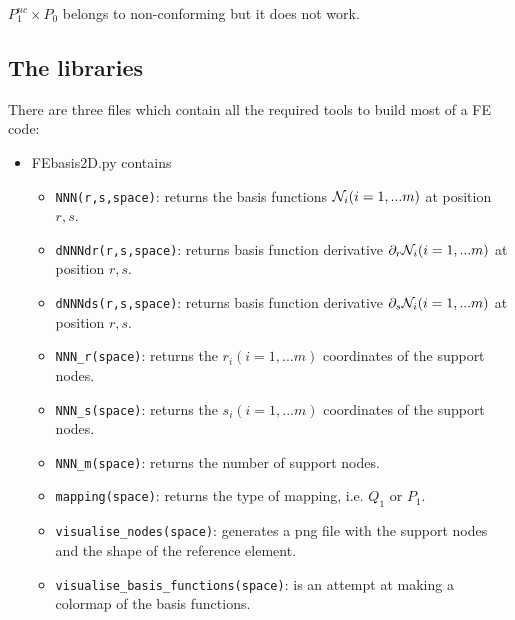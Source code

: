 \newpage



$P_1^{nc} \times P_0$ belongs to non-conforming but it does not work.

\newpage
\subsection*{The libraries}

There are three files which contain all the required tools to build most of a FE code:

\begin{itemize}

\item {\pythonfile FEbasis2D.py} contains 

\begin{itemize}
\item \lstinline{NNN(r,s,space)}: returns the basis functions ${\mathcal{N}}_i (i=1,...m)$ at position $r,s$.
\item \lstinline{dNNNdr(r,s,space)}: returns basis function derivative $\partial_r{\mathcal{N}}_i (i=1,...m)$ at position $r,s$.
\item \lstinline{dNNNds(r,s,space)}: returns basis function derivative $\partial_s{\mathcal{N}}_i (i=1,...m)$ at position $r,s$.
\item \lstinline{NNN_r(space)}: returns the $r_i (i=1,...m)$ coordinates of the support nodes.
\item \lstinline{NNN_s(space)}: returns the $s_i (i=1,...m)$ coordinates of the support nodes.
\item \lstinline{NNN_m(space)}: returns the number of support nodes.
\item \lstinline{mapping(space)}: returns the type of mapping, i.e. $Q_1$ or $P_1$.
\item \lstinline{visualise_nodes(space)}: generates a png file with the support nodes and the shape of the reference element.
\item \lstinline{visualise_basis_functions(space)}: is an attempt at making a colormap of the basis functions.
\end{itemize}



\end{itemize}
